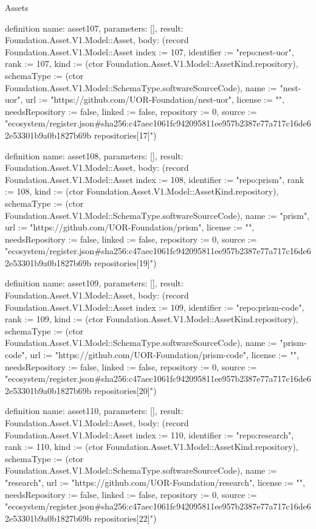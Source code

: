\begin{lexlean}{Assets}
\begin{semanticmodule}
definition{
  name: asset107,
  parameters: [],
  result: Foundation.Asset.V1.Model::Asset,
  body: (record Foundation.Asset.V1.Model::Asset {index := 107, identifier := "repo:nest-uor", rank := 107, kind := (ctor Foundation.Asset.V1.Model::AssetKind.repository), schemaType := (ctor Foundation.Asset.V1.Model::SchemaType.softwareSourceCode), name := "nest-uor", url := "https://github.com/UOR-Foundation/nest-uor", license := "", needsRepository := false, linked := false, repository := 0, source := "ecosystem/register.json#sha256:c47aec1061fc942095811ee957b2387e77a717c16de62e53301b9a0b1827b69b repositories[17]"})
}

definition{
  name: asset108,
  parameters: [],
  result: Foundation.Asset.V1.Model::Asset,
  body: (record Foundation.Asset.V1.Model::Asset {index := 108, identifier := "repo:prism", rank := 108, kind := (ctor Foundation.Asset.V1.Model::AssetKind.repository), schemaType := (ctor Foundation.Asset.V1.Model::SchemaType.softwareSourceCode), name := "prism", url := "https://github.com/UOR-Foundation/prism", license := "", needsRepository := false, linked := false, repository := 0, source := "ecosystem/register.json#sha256:c47aec1061fc942095811ee957b2387e77a717c16de62e53301b9a0b1827b69b repositories[19]"})
}

definition{
  name: asset109,
  parameters: [],
  result: Foundation.Asset.V1.Model::Asset,
  body: (record Foundation.Asset.V1.Model::Asset {index := 109, identifier := "repo:prism-code", rank := 109, kind := (ctor Foundation.Asset.V1.Model::AssetKind.repository), schemaType := (ctor Foundation.Asset.V1.Model::SchemaType.softwareSourceCode), name := "prism-code", url := "https://github.com/UOR-Foundation/prism-code", license := "", needsRepository := false, linked := false, repository := 0, source := "ecosystem/register.json#sha256:c47aec1061fc942095811ee957b2387e77a717c16de62e53301b9a0b1827b69b repositories[20]"})
}

definition{
  name: asset110,
  parameters: [],
  result: Foundation.Asset.V1.Model::Asset,
  body: (record Foundation.Asset.V1.Model::Asset {index := 110, identifier := "repo:research", rank := 110, kind := (ctor Foundation.Asset.V1.Model::AssetKind.repository), schemaType := (ctor Foundation.Asset.V1.Model::SchemaType.softwareSourceCode), name := "research", url := "https://github.com/UOR-Foundation/research", license := "", needsRepository := false, linked := false, repository := 0, source := "ecosystem/register.json#sha256:c47aec1061fc942095811ee957b2387e77a717c16de62e53301b9a0b1827b69b repositories[22]"})
}


\end{semanticmodule}
\end{lexlean}
